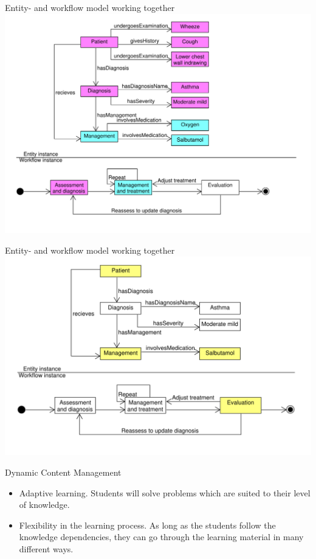 \documentclass{beamer}
\begin{document}
\begin{frame}{Entity- and workflow model working together}
\includegraphics[scale=0.40]{Integrated1}
\end{frame}

\begin{frame}{Entity- and workflow model working together	}
\includegraphics[scale=0.45]{Integrated2}
\end{frame}

\begin{frame}{Dynamic Content Management}
\begin{itemize}
	\item Adaptive learning. Students will solve problems which are suited to their level of knowledge.
	\item Flexibility in the learning process. As long as the students follow the knowledge dependencies, they can go through the learning material in many different ways.
\end{itemize}
\end{frame}
\end{document}

